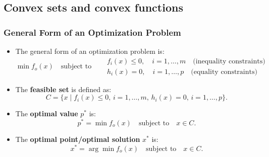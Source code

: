 \subsection{Convex sets and convex functions}
\subsubsection{General Form of an Optimization Problem}
\begin{definition}
    \begin{itemize}
        \item The general form of an optimization problem is:
        \[
        \min f_o(x) \quad \text{subject to} \quad 
        \begin{aligned}
            &f_i(x) \leq 0, \quad i = 1, \ldots, m \quad \text{(inequality constraints)} \\
            &h_i(x) = 0, \quad i = 1, \ldots, p \quad \text{(equality constraints)} 
        \end{aligned}
        \]
    
        \item The \textbf{feasible set} is defined as:
        \[
        C = \{x \mid f_i(x) \leq 0, \, i = 1, \ldots, m, \, h_i(x) = 0, \, i = 1, \ldots, p\}.
        \]
    
        \item The \textbf{optimal value} $p^*$ is:
        \[
        p^* = \min f_o(x) \quad \text{subject to} \quad x \in C.
        \]
    
        \item The \textbf{optimal point/optimal solution} $x^*$ is:
        \[
        x^* = \arg \min f_o(x) \quad \text{subject to} \quad x \in C.
        \]
    \end{itemize}
\end{definition}
